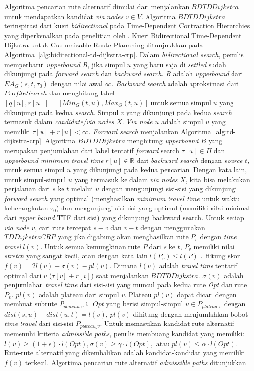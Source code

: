 Algoritma pencarian rute alternatif dimulai dari menjalankan $BDTDDijkstra$ untuk mendapatkan kandidat \textit{via nodes} $v\in V$. Algoritma $BDTDDijkstra$ terinspirasi dari kueri \textit{bidirectional} pada Time-Dependent Contraction Hierarchies yang diperkenalkan pada penelitian oleh \cite{Veit2013}. Kueri Bidirectional Time-Dependent Dijkstra untuk Customizable Route Plannning ditunjukkkan pada Algoritma~\ref{alg:bidirectional-td-dijkstra-crp}. Dalam \textit{bidirectional search}, penulis memperbarui \textit{upperbound} $B$, jika simpul $u$ yang baru saja di \textit{settled} sudah dikunjungi pada \textit{forward search} dan \textit{backward search}. $B$ adalah \textit{upperbound} dari $EA_G(s,t,\tau_0)$ dengan nilai awal $\infty$. \textit{Backward search} adalah aproksimasi dari $ProfileSearch$ dan menghitung label $[q[u], r[u]]=[Min_G(t,u), Max_G(t,u)]$ untuk semua simpul $u$ yang dikunjungi pada kedua \textit{search}. Simpul $v$ yang dikunjungi pada kedua \textit{search} termasuk dalam \textit{candidate/via nodes} $X$. \textit{Via node} $u$ adalah simpul $u$ yang memiliki $\tau[u] + r[u] < \infty$. \textit{Forward search} menjalankan Algoritma~\ref{alg:td-dijkstra-crp}. Algoritma $BDTDDijkstra$ menghitung \textit{upperbound} $B$ yang merupakan penjumlahan dari label tentatif \textit{forward} search $\tau[u]\in \Pi$ dan \textit{upperbound minimum travel time} $r[u]\in \mathbb{R}$ dari \textit{backward search} dengan \textit{source} $t$, untuk semua simpul $u$ yang dikunjungi pada kedua pencarian. Dengan kata lain, untuk simpul-simpul $u$ yang termasuk ke dalam \textit{via nodes} $X$, kita bisa melakukan perjalanan dari $s$ ke $t$ melalui $u$ dengan mengunjungi sisi-sisi yang dikunjungi \textit{forward search} yang optimal (menghasilkan \textit{minimum travel time } untuk waktu keberangkatan $\tau_0$) dan mengunjungi sisi-sisi yang optimal (memiliki nilai minimal dari \textit{upper bound} TTF dari sisi) yang dikunjungi backward search. Untuk setiap \textit{via node} $v$, cari rute tercepat $s-v$ dan $v-t$ dengan menggunakan $TDDijkstraCRP$ yang jika digabung akan menghasilkan rute $P_v$ dengan \textit{time travel} $l(v)$. Untuk semua kemungkinan rute $P$  dari $s$ ke $t$, $P_v$ memiliki nilai \textit{stretch} yang sangat kecil, atau dengan kata lain $l(P_v)\leq l(P)$ \cite{Abraham2010}. Hitung skor $f(v)=2l(v)+\sigma(v)-pl(v)$. Dimana $l(v)$ adalah \textit{travel time } tentatif optimal dari $v$  ($\tau[v]+r[v]$) saat menjalankan $BDTDDijkstra$. $\sigma(v)$ adalah penjumlahan \textit{travel time} dari sisi-sisi yang muncul pada kedua rute \textit{Opt} dan rute $P_v$. $pl(v)$ adalah plateau dari simpul $v$. Plateau $pl(v)$ dapat dicari dengan membuat subrute $P_{plateau\_v}\subseteq Opt$ yang berisi simpul-simpul $u\in P_{plateau\_v}$ dengan $dist(s,u)+dist(u,t)=l(v)$, $pl(v)$ dihitung dengan menjumlahkan bobot \textit{time travel} dari sisi-sisi $P_{plateau\_v}$. Untuk memastikan kandidat rute alternatif memenuhi kriteria \textit{admissible paths}, penulis membuang kandidat yang memiliki: $l(v)\geq (1+\epsilon)\cdot l(Opt), \sigma(v)\geq\gamma \cdot l(Opt), \text{ atau } pl(v)\leq \alpha \cdot l(Opt)$. Rute-rute alternatif yang dikembalikan adalah kandidat-kandidat yang memiliki $f(v)$ terkecil. Algortima pencarian rute alternatif \textit{admissible paths} ditunjukkan 